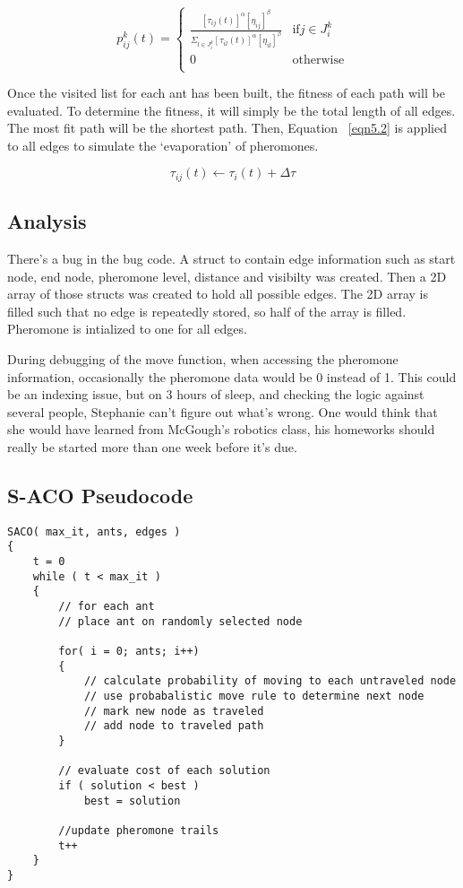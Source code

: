 \begin{equation} \label{eqn5.5}
p_{ij}^{k}(t) = 
	\begin{cases}
	\frac{ [\tau_{ij}(t)]^\alpha [\eta_{ij}]^\beta} {\Sigma_{l \in J_i^k}[\tau_{il}(t)]^\alpha[\eta_{il}]^\beta } & \text{if} j \in J_i^k \\
	0 	& \text{otherwise} \\
	\end{cases}
\end{equation}

Once the visited list for each ant has been built, the fitness of each path will be evaluated. To determine the fitness, it will simply be the total length of all edges. The most fit path will be the shortest path. Then, Equation ~\ref{eqn5.2} is applied to all edges to simulate the `evaporation' of pheromones. 

\begin{equation} \label{eqn5.2}
\tau_{ij}(t) \leftarrow \tau_i(t) + \Delta \tau
\end{equation}

\subsection{Analysis}
There's a bug in the bug code. A struct to contain edge information such as start node, end node, pheromone level, distance and visibilty was created. Then a 2D array of those structs was created to hold all possible edges. The 2D array is filled such that no edge is repeatedly stored, so half of the array is filled. Pheromone is intialized to one for all edges. 

During debugging of the move function, when accessing the pheromone information, occasionally the pheromone data would be 0 instead of 1. This could be an indexing issue, but on 3 hours of sleep, and checking the logic against several people, Stephanie can't figure out what's wrong. One would think that she would have learned from McGough's robotics class, his homeworks should really be started more than one week before it's due.

\subsection{ S-ACO Pseudocode } \label{acoPseudo}
\begin{lstlisting}
SACO( max_it, ants, edges )
{
	t = 0
	while ( t < max_it )
	{
		// for each ant
		// place ant on randomly selected node
		
		for( i = 0; ants; i++)
		{
			// calculate probability of moving to each untraveled node
			// use probabalistic move rule to determine next node
			// mark new node as traveled
			// add node to traveled path
		}
		
		// evaluate cost of each solution
		if ( solution < best )
			best = solution

		//update pheromone trails
		t++
	}
}
\end{lstlisting}


